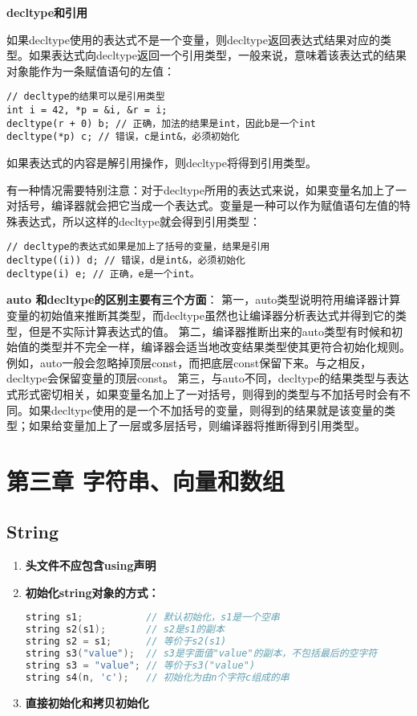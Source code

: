 \documentclass[
  a4paper,
  oneside,tablecaptionabove
]{scrbook}
\begin{document}
\textbf{decltype和引用}

如果decltype使用的表达式不是一个变量，则decltype返回表达式结果对应的类型。如果表达式向decltype返回一个引用类型，一般来说，意味着该表达式的结果对象能作为一条赋值语句的左值：

\begin{lstlisting}
// decltype的结果可以是引用类型
int i = 42, *p = &i, &r = i;
decltype(r + 0) b; // 正确，加法的结果是int，因此b是一个int
decltype(*p) c; // 错误，c是int&，必须初始化
\end{lstlisting}

如果表达式的内容是解引用操作，则decltype将得到引用类型。

有一种情况需要特别注意：对于decltype所用的表达式来说，如果变量名加上了一对括号，编译器就会把它当成一个表达式。变量是一种可以作为赋值语句左值的特殊表达式，所以这样的decltype就会得到引用类型：

\begin{lstlisting}
// decltype的表达式如果是加上了括号的变量，结果是引用
decltype((i)) d; // 错误，d是int&，必须初始化
decltype(i) e; // 正确，e是一个int。
\end{lstlisting}

\textbf{auto 和decltype的区别主要有三个方面}：
第一，auto类型说明符用编译器计算变量的初始值来推断其类型，而decltype虽然也让编译器分析表达式并得到它的类型，但是不实际计算表达式的值。
第二，编译器推断出来的auto类型有时候和初始值的类型并不完全一样，编译器会适当地改变结果类型使其更符合初始化规则。例如，auto一般会忽略掉顶层const，而把底层const保留下来。与之相反，decltype会保留变量的顶层const。
第三，与auto不同，decltype的结果类型与表达式形式密切相关，如果变量名加上了一对括号，则得到的类型与不加括号时会有不同。如果decltype使用的是一个不加括号的变量，则得到的结果就是该变量的类型；如果给变量加上了一层或多层括号，则编译器将推断得到引用类型。

\chapter{第三章
字符串、向量和数组}\label{ux7b2cux4e09ux7ae0-ux5b57ux7b26ux4e32ux5411ux91cfux548cux6570ux7ec4}

\section{String}\label{string}

\begin{enumerate}
\def\labelenumi{\arabic{enumi}.}
\item
  \textbf{头文件不应包含using声明}\\
\item
  \textbf{初始化string对象的方式：}

\begin{lstlisting}[language={C++}]
string s1;           // 默认初始化，s1是一个空串
string s2(s1);       // s2是s1的副本
string s2 = s1;      // 等价于s2(s1)
string s3("value");  // s3是字面值"value"的副本，不包括最后的空字符
string s3 = "value"; // 等价于s3("value")
string s4(n, 'c');   // 初始化为由n个字符c组成的串
\end{lstlisting}
\item
  \textbf{直接初始化和拷贝初始化}
\end{enumerate}
\end{document}
